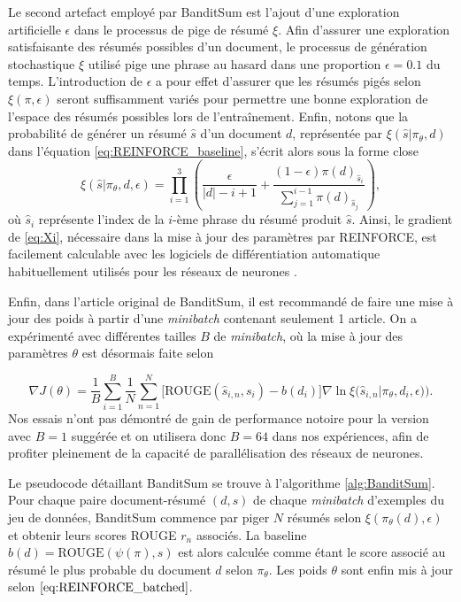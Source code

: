 Le second artefact employé par BanditSum est l'ajout d'une exploration artificielle
$\epsilon$ dans le processus de pige de résumé $\xi$.
Afin d'assurer une exploration satisfaisante des résumés possibles d'un document, le processus 
de génération stochastique $\xi$ utilisé pige une phrase au hasard dans une 
proportion $\epsilon=0.1$ du temps.
L'introduction de $\epsilon$ a pour effet d'assurer que les résumés pigés selon $\xi(\pi, \epsilon)$ seront 
suffisamment variés pour permettre une bonne exploration de l'espace des résumés possibles lors de
l'entraînement.
Enfin, notons que la probabilité de générer un résumé $\hat{s}$ d'un document $d$, représentée par
$\xi \left(\hat{s} | \pi_\theta, d \right)$ dans l'équation
\ref{eq:REINFORCE_baseline}, s'écrit alors sous la forme close
\begin{equation}
    \xi \left(\hat{s} | \pi_\theta, d, \epsilon \right) = \displaystyle \prod_{i=1}^3 \left(\dfrac{\epsilon}{|d| -i + 1}  + \dfrac{(1 - \epsilon)\pi(d)_{\hat{s}_i}}{\sum_{j=1}^{i-1} \pi(d)_{\hat{s}_j}}\right),
    \label{eq:Xi}
\end{equation}
où $\hat{s}_i$ représente l'index de la $i$-ème phrase du résumé produit $\hat{s}$. 
Ainsi, le gradient de \eqref{eq:Xi}, nécessaire dans la mise à jour des paramètres 
par REINFORCE, est facilement calculable avec les logiciels de différentiation automatique
habituellement utilisés pour les réseaux de neurones \citep{tensorflow2015-whitepaper,pytorch}.

Enfin, dans l'article original de BanditSum, il est recommandé 
de faire une mise à jour des poids à partir d'une \textit{minibatch} contenant 
seulement 1 article.
On a expérimenté avec différentes tailles $B$ de \textit{minibatch}, où la 
mise à jour des paramètres $\theta$ est désormais faite selon 

\begin{equation}
    \nabla J(\theta) = \frac{1}{B}\sum_{i=1}^B \frac{1}{N} \sum_{n=1}^N \big[\text{ROUGE}(\hat{s}_{i,n}, s_i) - b(d_i)\big]\nabla \ln \xi\big(\hat{s}_{i,n}| \pi_\theta, d_i, \epsilon)\big).
    \label{eq:REINFORCE_batched}
\end{equation}
Nos essais n'ont pas démontré de gain de performance notoire pour la version avec $B=1$
suggérée et on utilisera donc $B=64$ dans nos expériences, 
afin de profiter pleinement de la capacité de parallélisation 
des réseaux de neurones.

Le pseudocode détaillant BanditSum se trouve à l'algorithme 
\ref{alg:BanditSum}.
Pour chaque paire document-résumé $(d,s)$ de chaque \textit{minibatch} d'exemples 
du jeu de données, BanditSum commence par piger $N$ résumés selon $\xi(\pi_\theta(d), \epsilon)$
et obtenir leurs scores ROUGE $r_n$ associés.
La baseline $b(d)=\text{ROUGE}(\psi(\pi), s)$ est alors calculée comme étant le score associé au résumé
le plus probable du document $d$ selon $\pi_\theta$.
Les poids $\theta$ sont enfin mis à jour selon $\eqref{eq:REINFORCE_batched}$.

